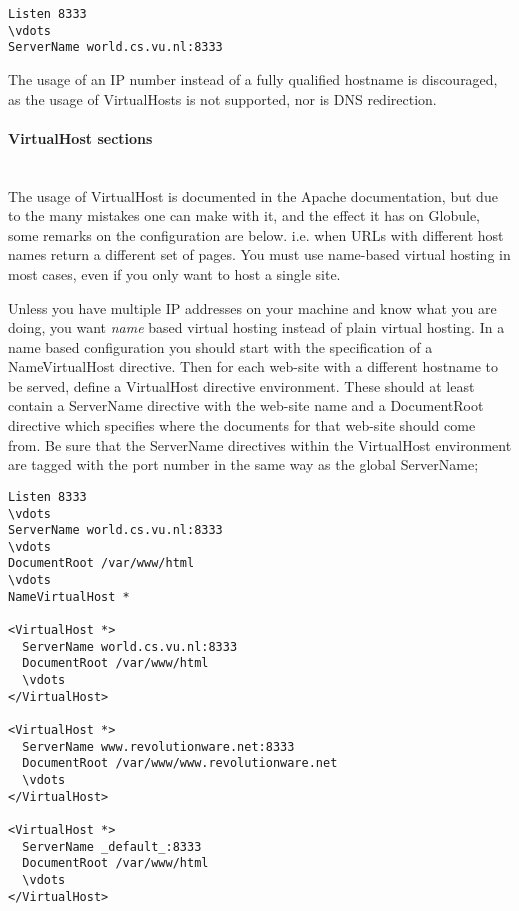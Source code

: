 \documentclass[10pt,a4paper]{article}
\makeatletter
\newenvironment{p}{\@open{P}{}}{\@close{P}}
\newenvironment{p}{}{\par}
\makeatother
\begin{document}
\begin{Verbatim}
Listen 8333
\vdots 
ServerName world.cs.vu.nl:8333
\end{Verbatim}

\begin{p}
The usage of an IP number instead of a fully qualified hostname is
discouraged, as the usage of VirtualHosts is not supported, nor is DNS
redirection.
\end{p}

\paragraph{\textbf{VirtualHost} sections}~\\

\begin{p}
The usage of VirtualHost is documented in the Apache documentation, but due to
the many mistakes one can make with it, and the effect it has on Globule, some
remarks on the configuration are below.
i.e. when URLs with different host names return a different set of
pages.  You must use name-based virtual hosting in most cases, even if
you only want to host a single site.
\end{p}

\begin{p}
Unless you have multiple IP addresses on your machine and know what you are
doing, you want \emph{name} based virtual hosting instead of plain virtual
hosting.  In a name based configuration you should start with the
specification of a NameVirtualHost directive.  Then for each web-site with a
different hostname to be served, define a VirtualHost directive
environment. These should at least contain a ServerName directive with the
web-site name and a DocumentRoot directive which specifies where the documents
for that web-site should come from.  Be sure that the ServerName directives
within the VirtualHost environment are tagged with the port number in the same
way as the global ServerName;
\end{p}

\begin{Verbatim}
Listen 8333
\vdots
ServerName world.cs.vu.nl:8333
\vdots
DocumentRoot /var/www/html
\vdots
NameVirtualHost *

<VirtualHost *>
  ServerName world.cs.vu.nl:8333
  DocumentRoot /var/www/html
  \vdots
</VirtualHost>

<VirtualHost *>
  ServerName www.revolutionware.net:8333
  DocumentRoot /var/www/www.revolutionware.net
  \vdots
</VirtualHost>

<VirtualHost *>
  ServerName _default_:8333
  DocumentRoot /var/www/html
  \vdots
</VirtualHost>
\end{Verbatim}
\end{document}
